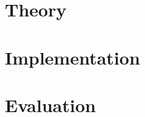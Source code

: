 \documentclass[
paper=a4,
fontsize = 12pt, %
headsepline,     %
titlepage,       %
numbers=noenddot,
headings=optiontohead, %
]{scrbook}
\begin{document}
\frontmatter
{}
\cofoot[\pagemark]{}
\rofoot[]{}



\tableofcontents
\listoffigures
\listoftables


\printnomenclature

\mainmatter
{}

\rofoot[]{\pagemark}





\part{Theory}\label{part:theory}














\part{Implementation}\label{part:implementation}



\part{Evaluation}\label{part:evaluation}
\end{document}
